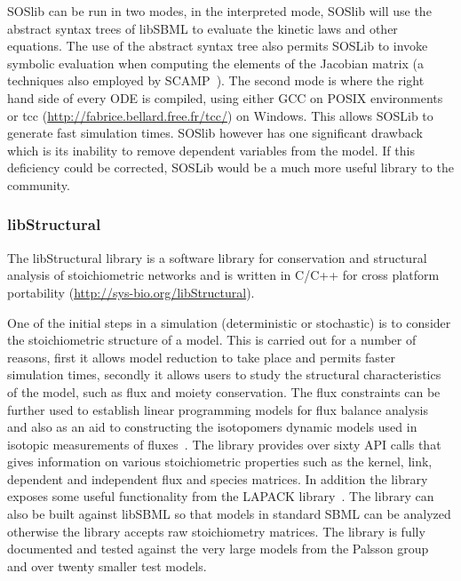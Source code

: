 \documentclass[12pt]{article}
\begin{document}
SOSlib can be run in two modes, in the interpreted mode, SOSlib will
use the abstract syntax trees of libSBML to evaluate the kinetic
laws and other equations. The use of the abstract syntax tree also
permits SOSLib to invoke symbolic evaluation when computing the
elements of the Jacobian matrix (a techniques also employed by
SCAMP~\citep{SauroF91,SauroScamp:1993}). The second mode is where the
right hand side of every ODE is compiled, using either GCC on POSIX
environments or tcc (\url{http://fabrice.bellard.free.fr/tcc/}) on
Windows. This allows SOSLib to generate fast simulation times.
SOSlib however has one significant drawback which is its inability
to remove dependent variables from the model. If this deficiency
could be corrected, SOSLib would be a much more useful library to
the community.

\subsubsection{libStructural}

The libStructural library is a software library for conservation and
structural analysis of stoichiometric networks and is written in
C/C++ for cross platform portability (\url{http://sys-bio.org/libStructural}).

One of the initial steps in a simulation (deterministic or
stochastic) is to consider the stoichiometric structure of a model.
This is carried out for a number of reasons, first it allows model
reduction to take place and permits faster simulation times,
secondly it allows users to study the structural characteristics of
the model, such as flux and moiety conservation. The flux
constraints can be further used to establish linear programming
models for flux balance analysis~\citep{FSm86a,PalssonBook:2007} and also as an aid to constructing the isotopomers dynamic models used in isotopic measurements of fluxes~\citep{Wiechert:2001,Schwender:2008}. The library provides over sixty API calls that gives information on various stoichiometric properties such as the kernel, link,
dependent and independent flux and species matrices. In addition the
library exposes some useful functionality from the LAPACK
library~\citep{Lapack:1999}. The library can also be built
against libSBML so that models in standard SBML can be analyzed
otherwise the library accepts raw stoichiometry matrices. The
library is fully documented and tested against the very large models
from the Palsson group~\citep{Price03} and over twenty smaller test models.
\end{document}
